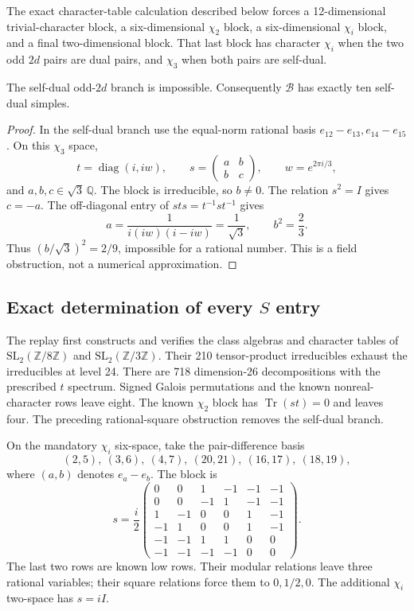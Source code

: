 The exact character-table calculation described below forces a
12-dimensional trivial-character block, a six-dimensional $\chi_2$
block, a six-dimensional $\chi_i$ block, and a final two-dimensional
block. That last block has character $\chi_i$ when the two odd
$2d$ pairs are dual pairs, and $\chi_3$ when both pairs are self-dual.

\begin{lemma}
The self-dual odd-$2d$ branch is impossible. Consequently $\mathcal B$
has exactly ten self-dual simples.
\end{lemma}
\begin{proof}
In the self-dual branch use the equal-norm rational basis
$e_{12}-e_{13},e_{14}-e_{15}$. On this $\chi_3$ space,
\[
 t=\operatorname{diag}(i,iw),\qquad
 s=\begin{pmatrix}a&b\\b&c\end{pmatrix},\qquad w=e^{2\pi i/3},
\]
and $a,b,c\in\sqrt3\,\mathbb Q$. The block is irreducible, so
$b\ne0$. The relation $s^2=I$ gives $c=-a$.
The off-diagonal entry of $sts=t^{-1}st^{-1}$ gives
\[
 a=\frac{1}{i(iw)(i-iw)}=\frac1{\sqrt3},\qquad b^2=\frac23.
\]
Thus $(b/\sqrt3)^2=2/9$, impossible for a rational number.
This is a field obstruction, not a numerical approximation.
\end{proof}

\subsection{Exact determination of every $S$ entry}

The replay first constructs and verifies the class algebras and
character tables of $\mathrm{SL}_2(\mathbb Z/8\mathbb Z)$ and
$\mathrm{SL}_2(\mathbb Z/3\mathbb Z)$. Their 210 tensor-product
irreducibles exhaust the irreducibles at level 24. There are 718
dimension-26 decompositions with the prescribed $t$ spectrum. Signed
Galois permutations and the known nonreal-character rows leave eight.
The known $\chi_2$ block has $\operatorname{Tr}(st)=0$ and leaves four.
The preceding rational-square obstruction removes the self-dual
branch.

On the mandatory $\chi_i$ six-space, take the pair-difference basis
\[
(2,5),\ (3,6),\ (4,7),\ (20,21),\ (16,17),\ (18,19),
\]
where $(a,b)$ denotes $e_a-e_b$. The block is
\[
 s=\frac i2
 \begin{pmatrix}
0&0&1&-1&-1&-1\\0&0&-1&1&-1&-1\\
1&-1&0&0&1&-1\\-1&1&0&0&1&-1\\
-1&-1&1&1&0&0\\-1&-1&-1&-1&0&0
 \end{pmatrix}.
\]
The last two rows are known low rows. Their modular relations leave
three rational variables; their square relations force them to
$0,1/2,0$. The additional $\chi_i$ two-space has $s=iI$.

